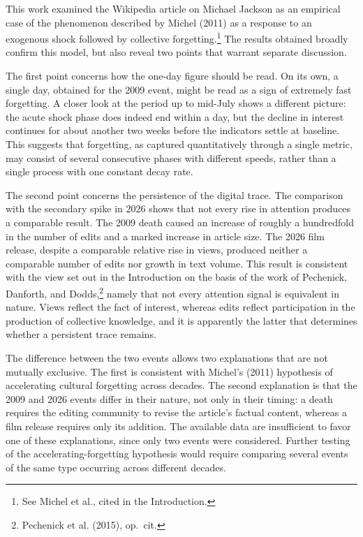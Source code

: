 \documentclass[11pt]{article}
\begin{document}
This work examined the Wikipedia article on Michael Jackson as an empirical case of the phenomenon described by Michel (2011) as a response to an exogenous shock followed by collective forgetting.\footnote{See Michel et al., cited in the Introduction.} The results obtained broadly confirm this model, but also reveal two points that warrant separate discussion.

The first point concerns how the one-day figure should be read. On its own, a single day, obtained for the 2009 event, might be read as a sign of extremely fast forgetting. A closer look at the period up to mid-July shows a different picture: the acute shock phase does indeed end within a day, but the decline in interest continues for about another two weeks before the indicators settle at baseline. This suggests that forgetting, as captured quantitatively through a single metric, may consist of several consecutive phases with different speeds, rather than a single process with one constant decay rate.

The second point concerns the persistence of the digital trace. The comparison with the secondary spike in 2026 shows that not every rise in attention produces a comparable result. The 2009 death caused an increase of roughly a hundredfold in the number of edits and a marked increase in article size. The 2026 film release, despite a comparable relative rise in views, produced neither a comparable number of edits nor growth in text volume. This result is consistent with the view set out in the Introduction on the basis of the work of Pechenick, Danforth, and Dodds,\footnote{Pechenick et al. (2015), op.\ cit.} namely that not every attention signal is equivalent in nature. Views reflect the fact of interest, whereas edits reflect participation in the production of collective knowledge, and it is apparently the latter that determines whether a persistent trace remains.

The difference between the two events allows two explanations that are not mutually exclusive. The first is consistent with Michel's (2011) hypothesis of accelerating cultural forgetting across decades. The second explanation is that the 2009 and 2026 events differ in their nature, not only in their timing: a death requires the editing community to revise the article's factual content, whereas a film release requires only its addition. The available data are insufficient to favor one of these explanations, since only two events were considered. Further testing of the accelerating-forgetting hypothesis would require comparing several events of the same type occurring across different decades.
\end{document}
